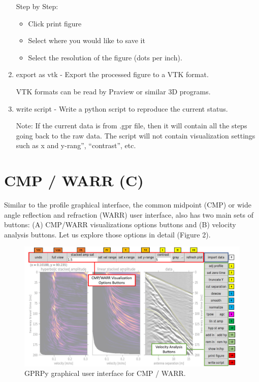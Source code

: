 \documentclass[12pt]{article}
\begin{document}
\begin{enumerate}
Step by Step:
\begin{itemize}
\item Click print figure 
\item Select where you would like to save it
\item Select the resolution of the figure (dots per inch).
\end{itemize}


\item export as vtk - Export the processed figure to a VTK format.

VTK formats can be read by Praview  or similar 3D programs.


\item write script - Write a python script to reproduce the current status. 

Note:  If the current data is from .gpr file, then it will contain all the steps going back to the raw data. 
The script will not contain visualization settings such as x and y-rang”, “contrast”, etc. 


\end{enumerate}





\section{CMP / WARR (C)}\label{CMP / WARR (C)}

Similar to the profile graphical interface, the common midpoint (CMP) or wide angle reflection and refraction (WARR) user interface, also has two main sets of buttons: (A) CMP/WARR visualizations options buttons and (B) velocity analysis buttons. Let us explore those options in detail (Figure 2).

											\begin{figure}[h]

	\includegraphics[width=\textwidth]{Figures/Figure2.pdf}
		\caption{GPRPy graphical user interface for CMP / WARR.}

											\end{figure}
\end{document}
